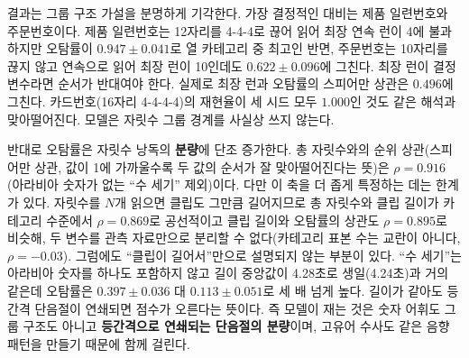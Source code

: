 \documentclass[10pt,twocolumn]{article}
\renewcommand{\emph}[1]{\textbf{#1}}
\begin{document}
결과는 그룹 구조 가설을 분명하게 기각한다. 가장 결정적인 대비는 제품 일련번호와 주문번호이다.
제품 일련번호는 12자리를 4-4-4로 끊어 읽어 최장 연속 런이 4에 불과하지만 오탐률이
$0.947\pm0.041$로 열 카테고리 중 최고인 반면, 주문번호는 10자리를 끊지 않고 연속으로 읽어 최장
런이 10인데도 $0.622\pm0.096$에 그친다. 최장 런이 결정 변수라면 순서가 반대여야 한다. 실제로
최장 런과 오탐률의 스피어만 상관은 $0.496$에 그친다. 카드번호(16자리 4-4-4-4)의 재현율이 세
시드 모두 $1.000$인 것도 같은 해석과 맞아떨어진다. 모델은 자릿수 그룹 경계를 사실상 쓰지 않는다.

반대로 오탐률은 자릿수 낭독의 \emph{분량}에 단조 증가한다. 총 자릿수와의 순위 상관(스피어만 상관, 값이 1에 가까울수록 두 값의 순서가 잘 맞아떨어진다는 뜻)은
$\rho=0.916$(아라비아 숫자가 없는 ``수 세기'' 제외)이다. 다만 이 축을 더 좁게 특정하는 데는
한계가 있다. 자릿수를 $N$개 읽으면 클립도 그만큼 길어지므로 총 자릿수와 클립 길이가 카테고리
수준에서 $\rho=0.869$로 공선적이고 클립 길이와 오탐률의 상관도 $\rho=0.895$로 비슷해, 두 변수를
관측 자료만으로 분리할 수 없다(카테고리 표본 수는 교란이 아니다, $\rho=-0.03$). 그럼에도
``클립이 길어서''만으로 설명되지 않는 부분이 있다. ``수 세기''는 아라비아 숫자를 하나도 포함하지
않고 길이 중앙값이 4.28초로 생일(4.24초)과 거의 같은데 오탐률은 $0.397\pm0.036$ 대
$0.113\pm0.051$로 세 배 넘게 높다. 길이가 같아도 등간격 단음절이 연쇄되면 점수가 오른다는
뜻이다. 즉 모델이 재는 것은 숫자 어휘도 그룹 구조도 아니고 \emph{등간격으로 연쇄되는 단음절의
분량}이며, 고유어 수사도 같은 음향 패턴을 만들기 때문에 함께 걸린다.
\end{document}
